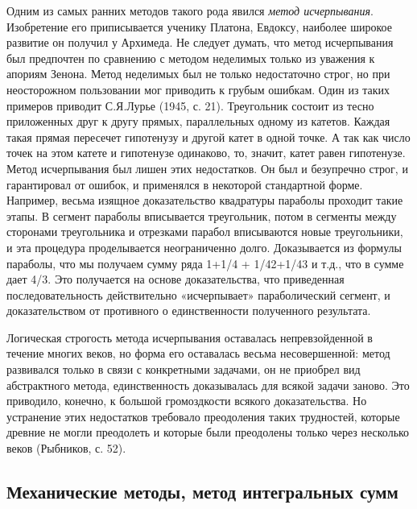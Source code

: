 Одним  из   самых  ранних  методов  такого   рода  явился  \emph{метод
исчерпывания}. Изобретение его приписывается ученику Платона, Евдоксу,
наиболее широкое  развитие он получил  у Архимеда. Не  следует думать,
что метод исчерпывания был предпочтен по сравнению с методом неделимых
только из  уважения к  апориям Зенона. Метод  неделимых был  не только
недостаточно строг,  но при  неосторожном пользовании мог  приводить к
грубым  ошибкам.  Один из  таких  примеров  приводит С.Я.Лурье  (1945,
с.  21).  Треугольник  состоит  из  тесно  приложенных  друг  к  другу
прямых, параллельных одному из  катетов. Каждая такая прямая пересечет
гипотенузу  и другой  катет  в  одной точке.  А  так  как число  точек
на  этом  катете  и  гипотенузе одинаково,  то,  значит,  катет  равен
гипотенузе.  Метод исчерпывания  был  лишен этих  недостатков. Он  был
и  безупречно  строг,  и  гарантировал   от  ошибок,  и  применялся  в
некоторой стандартной  форме. Например, весьма  изящное доказательство
квадратуры  параболы   проходит  такие   этапы.  В   сегмент  параболы
вписывается треугольник, потом в сегменты между сторонами треугольника
и отрезками  парабол вписываются  новые треугольники, и  эта процедура
проделывается неограниченно  долго. Доказывается из  формулы параболы,
что  мы получаем  сумму ряда  1+1/4 +  1/42+1/43 и  т.д., что  в сумме
дает  4/3. Это  получается на  основе доказательства,  что приведенная
последовательность действительно «исчерпывает» параболический сегмент,
и   доказательством  от   противного   о  единственности   полученного
результата.

Логическая строгость метода  исчерпывания оставалась непревзойденной в
течение многих  веков, но  форма его оставалась  весьма несовершенной:
метод  развивался  только  в  связи  с  конкретными  задачами,  он  не
приобрел  вид  абстрактного  метода, единственность  доказывалась  для
всякой задачи  заново. Это приводило, конечно,  к большой громоздкости
всякого  доказательства.  Но  устранение  этих  недостатков  требовало
преодоления таких  трудностей, которые  древние не могли  преодолеть и
которые  были преодолены  только через  несколько веков  (Рыбников, с.
52).

\subsection{Механические методы, метод интегральных сумм}

